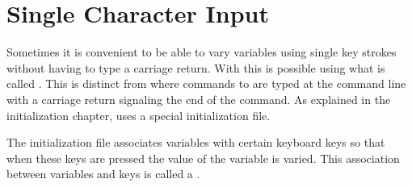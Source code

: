 \section{Single Character Input}

Sometimes it is convenient to be able to vary variables using single key strokes
without having to type a carriage return.
With \tao this is possible using what is called . This is distinct from
 where commands to \tao are typed at the command line with a carriage 
return signaling the end of the command. As explained in the initialization chapter,
 uses a special initialization file.

The  initialization file associates variables with certain keyboard keys
so that when these keys are pressed the value of the variable is varied. This association
between variables and keys is called a .

